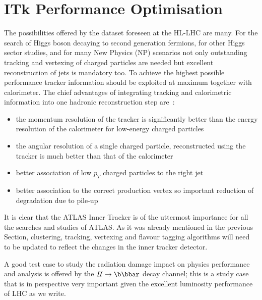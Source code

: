 \section{ITk Performance Optimisation}
\label{sec:algos}

The possibilities offered by the dataset foreseen at the HL-LHC are many. 
For the search of Higgs boson decaying to second generation fermions, for other Higgs sector 
studies, and for many New Physics (NP) scenarios not only outstanding tracking and vertexing of charged 
particles are needed but  excellent reconstruction of jets is mandatory  too. 
To achieve the highest possible performance tracker information should be exploited at maximum 
together with calorimeter. 
The chief advantages of integrating tracking and calorimetric information into one hadronic reconstruction
step are~\cite{ATLASParticleFlow}:
\begin{itemize}
\item the momentum resolution of the tracker is significantly better than the energy resolution of the
calorimeter for low-energy charged particles
\item the angular resolution of a single charged particle, reconstructed using the tracker is much better
than that of the calorimeter
\item better association of low $p_T$ charged particles to the right jet
\item better association to the correct production vertex so important reduction of degradation due to pile-up  
\end{itemize}
It is clear that the ATLAS Inner Tracker is of the uttermost importance for all
the searches and studies of ATLAS. 
As it was already mentioned in the previous Section, clustering, tracking, vertexing and flavour tagging 
algorithms will need to be updated to reflect the changes in the inner tracker detector.

A good  test case to 
study the radiation damage impact  on physics  performance and analysis is offered by 
the $H\to\b\bbar$ decay channel; 
this is a study case that is in 
perspective very important given the excellent luminosity performance of LHC as we write.

